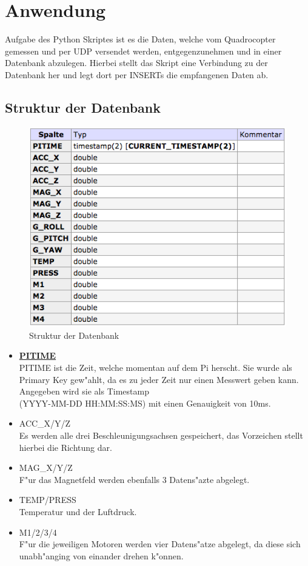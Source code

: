 \documentclass[oneside, a4paper, 11pt]{report}
\begin{document}
	\chapter{Anwendung}
		Aufgabe des Python Skriptes ist es die Daten, welche vom Quadrocopter gemessen und per UDP versendet werden, entgegenzunehmen und in einer Datenbank abzulegen. Hierbei stellt das Skript eine Verbindung zu der Datenbank her und legt dort per INSERTs die empfangenen Daten ab.
		\section{Struktur der Datenbank}
			\begin{figure}[h!]
				\centering
				\includegraphics[width=0.4\linewidth]{img/tblstr.png}
				\caption{Struktur der Datenbank \label{db_str}}
			\end{figure}
			\begin{itemize}
				\item \underline{\textbf{PITIME}}\\
					PITIME ist die Zeit, welche momentan auf dem Pi herscht. Sie wurde als Primary Key gew"ahlt, da es zu jeder Zeit nur einen Messwert geben kann. Angegeben wird sie als Timestamp \\
					(YYYY-MM-DD HH:MM:SS:MS) mit einen Genauigkeit von 10ms.
				\item ACC\_X/Y/Z\\
					Es werden alle drei Beschleunigungsachsen gespeichert, das Vorzeichen stellt hierbei die Richtung dar. 
				\item MAG\_X/Y/Z\\
					F"ur das Magnetfeld werden ebenfalls 3 Datens"azte abgelegt. 
				\item TEMP/PRESS\\
					Temperatur und der Luftdruck. 
				\item M1/2/3/4\\
					F"ur die jeweiligen Motoren werden vier Datens"atze abgelegt, da diese sich unabh"anging von einander drehen k"onnen.
			\end{itemize}
		\newpage
\end{document}
